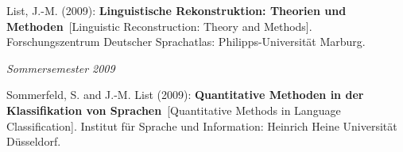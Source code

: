 \nopagebreak\noindent List, J.-M. (2009): \textbf{Linguistische Rekonstruktion: Theorien und Methoden}\ [Linguistic Reconstruction: Theory and Methods]. Forschungszentrum Deutscher Sprachatlas: Philipps-Universität Marburg.\vspace{0.25cm}
\par
\noindent\textit{Sommersemester 2009}\par\nopagebreak\vspace{0.25cm}
\nopagebreak\noindent Sommerfeld, S. and J.-M. List (2009): \textbf{Quantitative Methoden in der Klassifikation von Sprachen}\ [Quantitative Methods in Language Classification]. Institut für Sprache und Information: Heinrich Heine Universität Düsseldorf.\vspace{0.25cm}
\par
